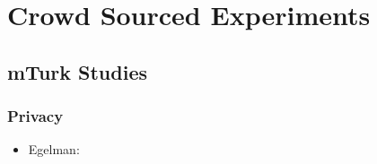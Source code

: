 
\chapter[Crowd Sourced Experiments]{Crowd Sourced Experiments}\label{chap:crowd_sourced_experiments}


\section{mTurk Studies}
\subsection{Privacy}
\begin{itemize}
\item Egelman: \cite{Egelman2015AverageUser}
\end{itemize}



